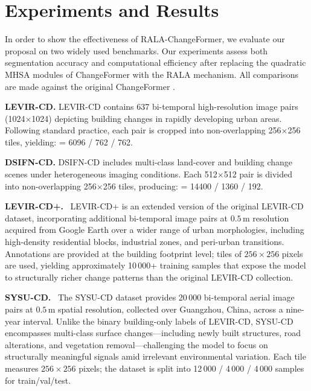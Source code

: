 \documentclass[runningheads]{llncs}
\newcommand{\journal}[1]{{\color{orange}#1}}
\begin{document}
\section{Experiments and Results}
\label{sec:experiments}

\noindent
In order to show the effectiveness of RALA-ChangeFormer, we evaluate our
proposal on two widely used benchmarks. Our experiments assess both
segmentation accuracy and computational efficiency after replacing the quadratic
MHSA modules of ChangeFormer with the RALA mechanism. All comparisons are made
against the original ChangeFormer \cite{Bandara2022ChangeFormer}.

\noindent \textbf{LEVIR-CD.} LEVIR-CD \cite{Zheng2020LEVIR} contains 637
bi-temporal high-resolution image pairs (1024$\times$1024) depicting building
changes in rapidly developing urban areas. Following standard practice, each
pair is cropped into non-overlapping 256$\times$256 tiles, yielding:
 = 6096 / 762 / 762.

\noindent \textbf{DSIFN-CD.} DSIFN-CD \cite{Zhang2020FusionNetDSIFN} includes
multi-class land-cover and building change scenes under heterogeneous imaging
conditions. Each 512$\times$512 pair is divided into non-overlapping
256$\times$256 tiles, producing:  = 14400 / 1360 / 192.


\journal{\noindent \textbf{LEVIR-CD+.}~\cite{Zheng2020LEVIR}
LEVIR-CD+ is an extended version of the original LEVIR-CD dataset, incorporating
additional bi-temporal image pairs at $0.5\,\mathrm{m}$ resolution acquired
from Google Earth over a wider range of urban morphologies, including
high-density residential blocks, industrial zones, and peri-urban transitions.
Annotations are provided at the building footprint level; tiles of
$256\times256$ pixels are used, yielding approximately 10\,000+ training
samples that expose the model to structurally richer change patterns than the
original LEVIR-CD collection.}

\journal{\noindent \textbf{SYSU-CD.}~\cite{ShiSYSU2022}
The SYSU-CD dataset provides 20\,000 bi-temporal aerial image pairs at
$0.5\,\mathrm{m}$ spatial resolution, collected over Guangzhou, China, across
a nine-year interval.
Unlike the binary building-only labels of LEVIR-CD, SYSU-CD encompasses
multi-class surface changes—including newly built structures, road alterations,
and vegetation removal—challenging the model to focus on structurally meaningful
signals amid irrelevant environmental variation.
Each tile measures $256\times256$ pixels; the dataset is split into
12\,000 / 4\,000 / 4\,000 samples for train/val/test.}
\end{document}
